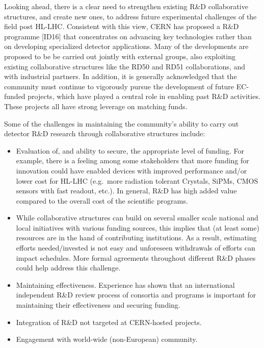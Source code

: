Looking ahead, there is a clear need to strengthen existing R\&D collaborative structures, and create new ones, to address future experimental challenges of the field post HL-LHC. Consistent with this view, CERN has proposed a R\&D programme [ID16] that concentrates on advancing key technologies rather than on developing specialized detector applications. %
Many of the developments are proposed to be be carried out jointly with external groups, also exploiting existing collaborative structures like the RD50 and RD51 collaborations, and with industrial partners.
In addition, it is generally acknowledged that the community must continue to vigorously pursue the development of future EC-funded projects, which have played a central role in enabling past R\&D activities.  
These projects all have strong leverage on matching funds. 

Some of the challenges in maintaining the community's ability to carry out detector R\&D research through collaborative structures include:
\begin{itemize}
    \item Evaluation of, and ability to secure, the appropriate level of funding.  For example, there is a feeling among some stakeholders that more funding for innovation could have enabled devices with improved performance and/or lower cost for HL-LHC (e.g.\ more radiation tolerant Crystals, SiPMs, CMOS sensors with fast readout, etc.).  In general, R\&D has high added value compared to the overall cost of the scientific programs.
    \item While collaborative structures can build on several smaller scale national and local initiatives with various funding sources, this implies that (at least some) resources are in the hand of contributing institutions.  As a result, estimating efforts needed/invested is not easy and unforeseen withdrawals of efforts can impact schedules. More formal agreements throughout different R\&D phases could help address this challenge.
    \item Maintaining effectiveness.  Experience has shown that an international independent R\&D review process of consortia and programs is important for maintaining their effectiveness and securing funding.
    \item Integration of R\&D not targeted at CERN-hosted projects.
    \item Engagement with world-wide (non-European) community.
\end{itemize}

